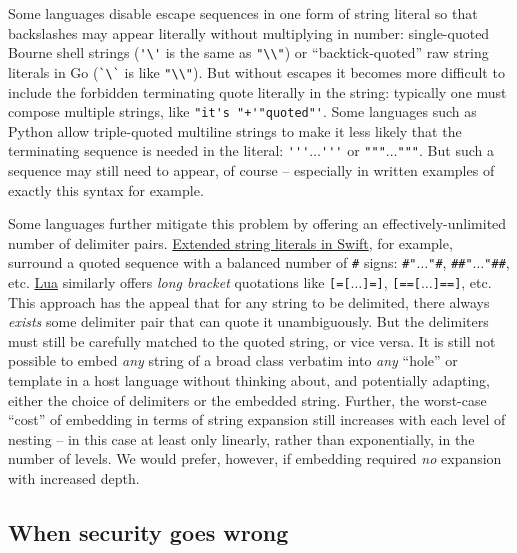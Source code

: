 Some languages disable escape sequences in one form of string literal
so that backslashes may appear literally without multiplying in number:
\eg single-quoted Bourne shell strings (\verb|'\'| is the same as \verb|"\\"|)
or ``backtick-quoted'' raw string literals
in Go (\verb|`\`| is like \verb|"\\"|).
But without escapes it becomes more difficult to include
the forbidden terminating quote literally in the string:
typically one must compose multiple strings,
like \verb|"it's "+'"quoted"'|.
Some languages such as Python allow triple-quoted multiline strings
to make it less likely that the terminating sequence is needed in the literal:
\eg \verb|'''|$\dots$\verb|'''| or \verb|"""|$\dots$\verb|"""|.
But such a sequence may still need to appear, of course --
especially in written examples of exactly this syntax for example.

Some languages further mitigate this problem
by offering an effectively-unlimited number of delimiter pairs.
\href{https://docs.swift.org/swift-book/LanguageGuide/StringsAndCharacters.html#ID286}{Extended string literals in Swift}, for example,
surround a quoted sequence with a balanced number of \verb|#| signs:
\eg \verb|#"|$\dots$\verb|"#|, \verb|##"|$\dots$\verb|"##|, etc.
\href{https://www.lua.org/manual/5.1/manual.html}{Lua}
similarly offers \emph{long bracket} quotations
like \verb|[=[|$\dots$\verb|]=]|, \verb|[==[|$\dots$\verb|]==]|, etc.
This approach has the appeal that for any string to be delimited,
there always \emph{exists} some delimiter pair
that can quote it unambiguously.
But the delimiters must still be carefully matched to the quoted string,
or vice versa.
It is still not possible to embed \emph{any} string of a broad class
verbatim into \emph{any} ``hole'' or template in a host language
without thinking about, and potentially adapting,
either the choice of delimiters or the embedded string.
Further, the worst-case ``cost'' of embedding in terms of string expansion
still increases with each level of nesting --
in this case
at least only linearly, rather than exponentially, in the number of levels.
We would prefer, however, if embedding
required \emph{no} expansion with increased depth.



\subsection{When security goes wrong}

